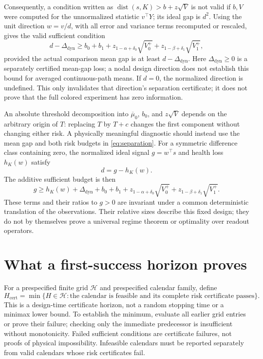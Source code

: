 \documentclass[11pt]{article}
\theoremstyle{remark}\newtheorem{remark}[theorem]{Remark}
\begin{document}
Consequently, a condition written as
$\operatorname{dist}(s,K)>b+z\sqrt V$ is not valid if $b,V$ were computed for the unnormalized statistic $v^\top Y$; its ideal gap is $d^2$.
Using the unit direction $w=v/d$, with all error and variance terms recomputed or rescaled, gives the valid sufficient condition
\begin{equation}\label{eq:distancegap}
 d-\Delta_{\mathrm{dyn}}\ge
 b_0+b_1+z_{1-\alpha+\delta_0}\sqrt{V_0^+}
            +z_{1-\beta+\delta_1}\sqrt{V_1^+},
\end{equation}
provided the actual comparison mean gap is at least $d-\Delta_{\mathrm{dyn}}$.
Here $\Delta_{\mathrm{dyn}}\ge0$ is a separately certified mean-gap loss; a nodal design direction does not establish this bound for averaged continuous-path means. If $d=0$, the normalized direction is undefined. This only invalidates that direction's separation certificate; it does not prove that the full colored experiment has zero information.

An absolute threshold decomposition into $\overline\mu_0$, $b_0$, and $z\sqrt V$ depends on the arbitrary origin of $T$: replacing $T$ by $T+c$ changes the first component without changing either risk. A physically meaningful diagnostic should instead use the mean gap and both risk budgets in \eqref{eq:separation}.
For a symmetric difference class containing zero, the normalized ideal signal $g=w^\top s$ and health loss $h_K(w)$ satisfy
\[
 d=g-h_K(w).
\]
The additive sufficient budget is then
\begin{equation}\label{eq:budget}
 g\ge h_K(w)+\Delta_{\mathrm{dyn}}+b_0+b_1+
 z_{1-\alpha+\delta_0}\sqrt{V_0^+}
 +z_{1-\beta+\delta_1}\sqrt{V_1^+}.
\end{equation}
These terms and their ratios to $g>0$ are invariant under a common deterministic translation of the observations. Their relative sizes describe this fixed design; they do not by themselves prove a universal regime theorem or optimality over readout operators.

\section{What a first-success horizon proves}
For a prespecified finite grid $\mathcal H$ and prespecified calendar family, define
\[
 H_{\mathrm{cert}}=\min\{H\in\mathcal H:
 \text{the calendar is feasible and its complete risk certificate passes}\}.
\]
This is a design-time certificate horizon, not a random stopping time or a minimax lower bound. To establish the minimum, evaluate all earlier grid entries or prove their failure; checking only the immediate predecessor is insufficient without monotonicity. Failed sufficient conditions are certificate failures, not proofs of physical impossibility. Infeasible calendars must be reported separately from valid calendars whose risk certificates fail.
\end{document}
